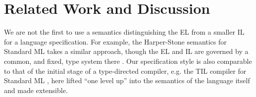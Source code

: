 \documentclass[preprint]{sigplanconf}
\begin{document}

\section{Related Work and Discussion}\label{prior-work}\label{sec:discussion}
\noindent We are not the first to use a semantics distinguishing the EL from a smaller IL  for a language specification. For example, the Harper-Stone semantics for Standard ML takes a similar approach, though the EL and IL are governed by a common, and fixed, type system there \cite{Harper00atype-theoretic}. Our specification style is also comparable to that of the initial stage of a type-directed compiler, e.g. the TIL compiler for Standard ML \cite{tarditi+:til-OLD}, here lifted ``one level up'' into the semantics of the language itself and made extensible. %
\end{document}
